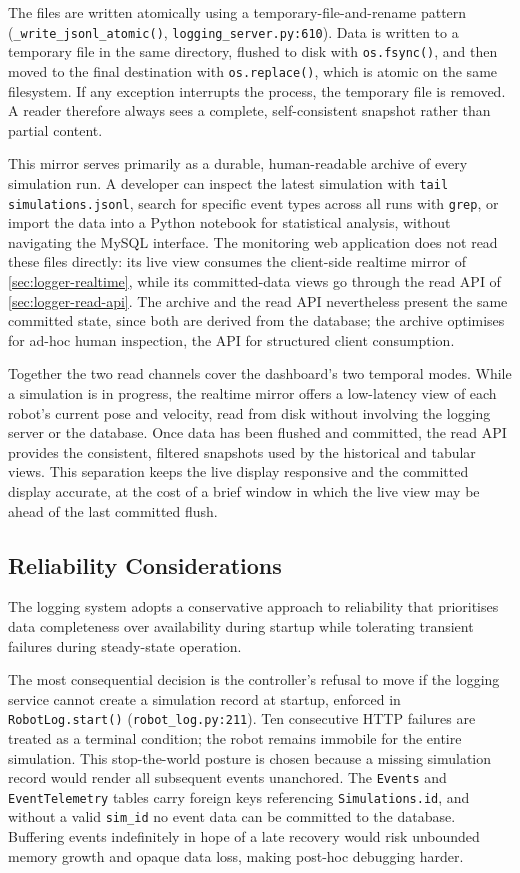 The files are written atomically using a temporary-file-and-rename pattern (\texttt{\_write\_jsonl\_atomic()}, \texttt{logging\_server.py:610}). Data is written to a temporary file in the same directory, flushed to disk with \texttt{os.fsync()}, and then moved to the final destination with \texttt{os.replace()}, which is atomic on the same filesystem. If any exception interrupts the process, the temporary file is removed. A reader therefore always sees a complete, self-consistent snapshot rather than partial content.

This mirror serves primarily as a durable, human-readable archive of every simulation run. A developer can inspect the latest simulation with \texttt{tail simulations.jsonl}, search for specific event types across all runs with \texttt{grep}, or import the data into a Python notebook for statistical analysis, without navigating the MySQL interface. The monitoring web application does not read these files directly: its live view consumes the client-side realtime mirror of \cref{sec:logger-realtime}, while its committed-data views go through the read API of \cref{sec:logger-read-api}. The archive and the read API nevertheless present the same committed state, since both are derived from the database; the archive optimises for ad-hoc human inspection, the API for structured client consumption.

Together the two read channels cover the dashboard's two temporal modes. While a simulation is in progress, the realtime mirror offers a low-latency view of each robot's current pose and velocity, read from disk without involving the logging server or the database. Once data has been flushed and committed, the read API provides the consistent, filtered snapshots used by the historical and tabular views. This separation keeps the live display responsive and the committed display accurate, at the cost of a brief window in which the live view may be ahead of the last committed flush.

\subsection{Reliability Considerations}
\label{sec:logger-reliability}

The logging system adopts a conservative approach to reliability that prioritises data completeness over availability during startup while tolerating transient failures during steady-state operation.

The most consequential decision is the controller's refusal to move if the logging service cannot create a simulation record at startup, enforced in \texttt{RobotLog.start()} (\texttt{robot\_log.py:211}). Ten consecutive HTTP failures are treated as a terminal condition; the robot remains immobile for the entire simulation. This stop-the-world posture is chosen because a missing simulation record would render all subsequent events unanchored. The \texttt{Events} and \texttt{EventTelemetry} tables carry foreign keys referencing \texttt{Simulations.id}, and without a valid \texttt{sim\_id} no event data can be committed to the database. Buffering events indefinitely in hope of a late recovery would risk unbounded memory growth and opaque data loss, making post-hoc debugging harder.

